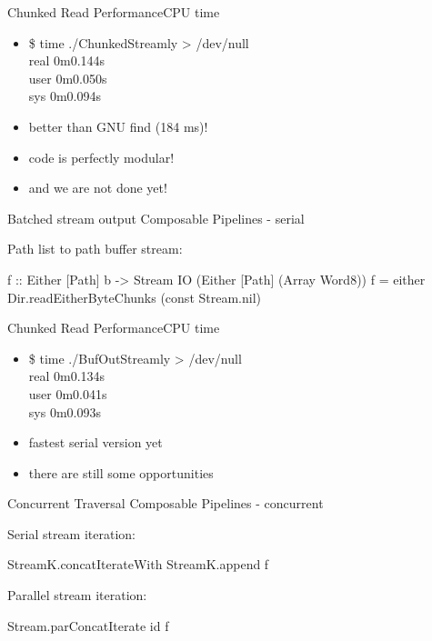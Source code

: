 \documentclass[17pt]{beamer}
\begin{document}
\begin{frame}{Chunked Read Performance}{CPU time}

\begin{itemize}
\item \$ time ./ChunkedStreamly > /dev/null \\
real    0m0.144s \\
user    0m0.050s \\
sys     0m0.094s \\

\item better than GNU find (184 ms)!
\item code is perfectly modular!
\item and we are not done yet!
\end{itemize}
\end{frame}

\begin{frame}[fragile]{Batched stream output}
{Composable Pipelines - serial}
\begin{minipage}{\textwidth}

Path list to path buffer stream:
\begin{code}
f :: Either [Path] b
  -> Stream IO (Either [Path] (Array Word8))
f = either
      Dir.readEitherByteChunks
      (const Stream.nil)
\end{code}
\end{minipage}
\end{frame}

\begin{frame}{Chunked Read Performance}{CPU time}

\begin{itemize}
\item \$ time ./BufOutStreamly > /dev/null \\
real    0m0.134s \\
user    0m0.041s \\
sys     0m0.093s \\

\item fastest serial version yet
\item there are still some opportunities
\end{itemize}
\end{frame}

\begin{frame}[fragile]{Concurrent Traversal}
{Composable Pipelines - concurrent}
\begin{minipage}{\textwidth}

Serial stream iteration:
\begin{code}
StreamK.concatIterateWith StreamK.append f
\end{code}

Parallel stream iteration:
\begin{code}
Stream.parConcatIterate id f
\end{code}
\end{minipage}
\end{frame}
\end{document}
